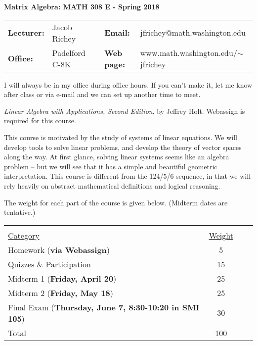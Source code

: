 \documentclass[11 pt]{report}
\begin{document}
\centerline{\bf Matrix Algebra: MATH 308 E - Spring 2018}
\vspace{0.2cm}
\begin{tabular}{lllll}
{\bf Lecturer: }    & Jacob Richey &  & {\bf Email: }       & jfrichey@math.washington.edu \\
{\bf Office: }      & Padelford C-8K        &  & {\bf Web page: }    & www.math.washington.edu/$\sim$jfrichey \\
\end{tabular}
\vspace{0.25cm}

I will always be in my office during office hours. If you can't make it, let me know after class or via e-mail and we can set up another time to meet.  \vspace{0.25cm}

 \emph{Linear Algebra with Applications, Second Edition}, by Jeffrey Holt. Webassign is required for this course. 

\vspace{0.25cm}

  This course is motivated by the study of systems of linear equations. We will 
develop tools to solve linear problems, and develop the theory of vector spaces along the way. At first glance, solving
linear systems seems like an algebra problem -- but we will see that it has a simple and beautiful geometric interpretation. 
This course is different from the 124/5/6 sequence, in that we will rely heavily on abstract mathematical definitions and logical reasoning. 

\vspace{0.25cm}

 The weight for each part of the course is given
below. (Midterm dates are tentative.)

\vspace{-.25in}

\begin{center}\begin{tabular}{lccl} &  \\
\underline{Category} & \underline{Weight}  \\
Homework   ({\bf via Webassign})                 & 5  \\
Quizzes \& Participation             &  15  \\
Midterm 1  ({\bf Friday, April 20})                   & 25  \\
Midterm 2  ({\bf Friday, May 18})                   & 25   \\
Final Exam ({\bf Thursday, June 7, 8:30-10:20 in SMI 105})                        & 30  \\
\hline Total                                        & 100
\end{tabular}
\end{center}
\end{document}
